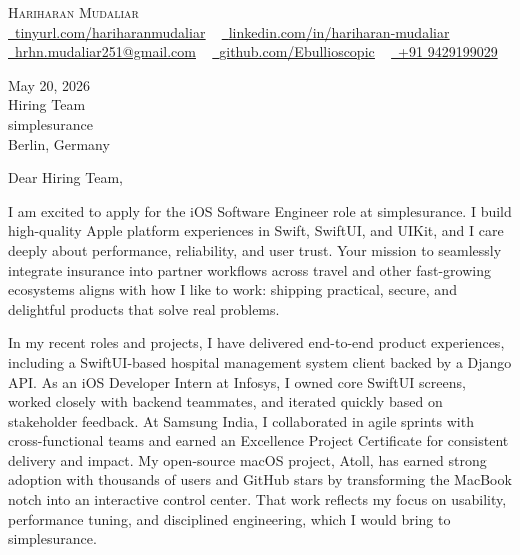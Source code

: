 \documentclass[letterpaper,11pt]{article}
\begin{document}
\begin{center}
    {\Huge \scshape Hariharan Mudaliar} \\ \vspace{1pt}
    \href{https://tinyurl.com/hariharanmudaliar}{\raisebox{-0.2\height}\faLink\ \underline{tinyurl.com/hariharanmudaliar}} ~
    \href{https://linkedin.com/in/hariharan-mudaliar}{\raisebox{-0.2\height}\faLinkedin\ \underline{linkedin.com/in/hariharan-mudaliar}} ~
    \href{mailto:hrhn.mudaliar251@gmail.com}{\raisebox{-0.2\height}\faEnvelope\ \underline{hrhn.mudaliar251@gmail.com}} ~
    \href{https://github.com/Ebullioscopic}{\raisebox{-0.2\height}\faGithub\ \underline{github.com/Ebullioscopic}} ~
    \href{tel:+919429199029}{\raisebox{-0.2\height}\faPhone\ +91 9429199029}
\end{center}

\vspace{8pt}

\noindent May 20, 2026 \\
\noindent Hiring Team \\
\noindent simplesurance \\
\noindent Berlin, Germany \\

\vspace{10pt}

\noindent Dear Hiring Team,

\vspace{6pt}

\noindent I am excited to apply for the iOS Software Engineer role at simplesurance. I build high-quality Apple platform experiences in Swift, SwiftUI, and UIKit, and I care deeply about performance, reliability, and user trust. Your mission to seamlessly integrate insurance into partner workflows across travel and other fast-growing ecosystems aligns with how I like to work: shipping practical, secure, and delightful products that solve real problems.

\vspace{6pt}

\noindent In my recent roles and projects, I have delivered end-to-end product experiences, including a SwiftUI-based hospital management system client backed by a Django API. As an iOS Developer Intern at Infosys, I owned core SwiftUI screens, worked closely with backend teammates, and iterated quickly based on stakeholder feedback. At Samsung India, I collaborated in agile sprints with cross-functional teams and earned an Excellence Project Certificate for consistent delivery and impact. My open-source macOS project, Atoll, has earned strong adoption with thousands of users and GitHub stars by transforming the MacBook notch into an interactive control center. That work reflects my focus on usability, performance tuning, and disciplined engineering, which I would bring to simplesurance.
\end{document}
